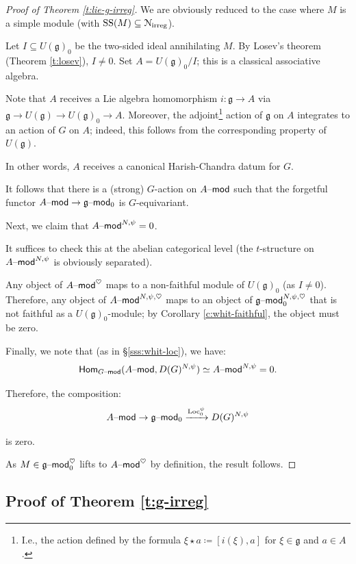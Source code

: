 \documentclass[reqno,11pt]{amsart}
\numberwithin{equation}{subsection}
\theoremstyle{remark}
\newcommand{\xar}[1]{\xrightarrow{#1}}
\newcommand{\Loc}{\on{Loc}}
\newcommand{\sN}{{\EuScript N}}
\newcommand{\fg}{{\mathfrak g}}
\newcommand{\on}{\operatorname}
\newcommand{\mathendash}{\text{\textendash}}
\renewcommand{\mod}{\mathendash\mathsf{mod}}
\newcommand{\TwoHom}{\mathsf{Hom}}
\newcommand{\heart}{\heartsuit}
\renewcommand{\subset}{\subseteq}
\newcommand{\irreg}{\on{irreg}}
\renewcommand{\SS}{\on{SS}}
\begin{document}
\begin{proof}[Proof of Theorem \ref{t:lie-g-irreg}]

\step We are obviously reduced to the case where
$M$ is a simple module (with $\SS(M) \subset \sN_{\irreg}$). 

Let $I \subset U(\fg)_0$ be the
two-sided ideal annihilating $M$. 
By Losev's theorem (Theorem \ref{t:losev}), $I \neq 0$. 
Set $A = U(\fg)_0/I$; this is a classical associative algebra.

\step Note that $A$ receives a Lie algebra homomorphism $i:\fg \to A$
via $\fg \to U(\fg) \to U(\fg)_0 \to A$. Moreover, the
adjoint\footnote{I.e., the action defined by the formula $\xi \star a \coloneqq
[i(\xi),a]$ for $\xi \in \fg$ and $a \in A$.} 
action of $\fg$ on $A$ 
integrates to an action of $G$ on $A$; indeed, this follows from
the corresponding property of $U(\fg)$.

In other words, $A$ receives a canonical Harish-Chandra datum for
$G$.

It follows that there is a (strong) $G$-action on $A\mod$ such that
the forgetful functor $A\mod \to \fg\mod_0$ is $G$-equivariant.

\step 

Next, we claim that $A\mod^{N,\psi} = 0$.

It suffices to check this at the abelian categorical level
(the $t$-structure on $A\mod^{N,\psi}$ is obviously separated).

Any object of $A\mod^{\heart}$ maps to a non-faithful module
of $U(\fg)_0$ (as $I \neq 0$). Therefore, any 
object of $A\mod^{N,\psi,\heart}$ maps to 
an object of $\fg\mod_0^{N,\psi,\heart}$ that is
not faithful as a $U(\fg)_0$-module; by Corollary \ref{c:whit-faithful},
the object must be zero.

\step Finally, we note that (as in \S \ref{sss:whit-loc}),
we have:
%
\[
\TwoHom_{G\mod}(A\mod,D(G)^{N,\psi}) \simeq A\mod^{N,\psi} = 0.
\]

\noindent Therefore, the composition:
%
\[
A\mod \to \fg\mod_0 \xar{\Loc_0^{\psi}} D(G)^{N,\psi}
\]

\noindent is zero. 

As $M \in \fg\mod_0^{\heart}$ lifts to $A\mod^{\heart}$ by definition, 
the result follows.

\end{proof}

\subsection{Proof of Theorem \ref{t:g-irreg}}
\end{document}
